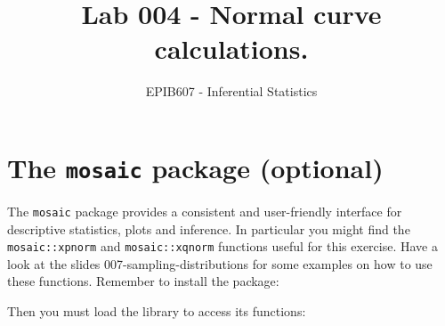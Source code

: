 \documentclass[letterpaper,12pt,twoside,]{pinp}
\title{Lab 004 - Normal curve calculations.}
\author[a]{EPIB607 - Inferential Statistics}
\affil[a]{Fall 2020, McGill University}
\begin{document}
\verticaladjustment{-2pt}

\maketitle
\thispagestyle{firststyle}



\hypertarget{the-mosaic-package-optional}{%
\section*{\texorpdfstring{The \texttt{mosaic} package
(optional)}{The mosaic package (optional)}}\label{the-mosaic-package-optional}}

The \texttt{mosaic} package provides a consistent and user-friendly
interface for descriptive statistics, plots and inference. In particular
you might find the \texttt{mosaic::xpnorm} and \texttt{mosaic::xqnorm}
functions useful for this exercise. Have a look at the slides
007-sampling-distributions for some examples on how to use these
functions. Remember to install the package:

\begin{Shaded}
\begin{Highlighting}[]
\NormalTok{(}\NormalTok{, } \NormalTok{)}
\end{Highlighting}
\end{Shaded}

Then you must load the library to access its functions:

\begin{Shaded}
\begin{Highlighting}[]
\end{Highlighting}
\end{Shaded}
\end{document}
